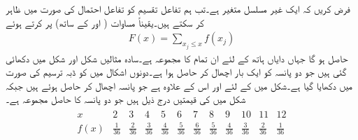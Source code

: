 فرض کریں کہ  ایک غیر مسلسل متغیر ہے۔تب ہم تفاعل تقسیم  کو تفاعل احتمال  کی صورت میں ظاہر کر سکتے ہیں۔یقیناً  مساوات  ( اور  کے ساتھ) پر کرتے ہوئے
\begin{align}\label{مساوات_شماریات_غیر_مسلسل_متغیر_ج}
F(x)=\sum_{x_j\le x} f(x_j)
\end{align}
حاصل ہو گا جہاں دایاں ہاتھ  کے لئے ان تمام  کا مجموعہ ہے۔سادہ مثالیں شکل  اور شکل  میں دکھائی گئی ہیں جو دو پانسہ کو ایک بار اچھال کر حاصل ہوا ہے۔دونوں اشکال میں  کو ڈبہ ترسیم کی صورت میں دکھایا گیا ہے۔شکل  میں  کے لئے  اور  اس کے علاوہ  ہے جو پانسہ اچھال کر حاصل ہوئے ہیں  جبکہ شکل  میں  کی قیمتیں درج ذیل ہیں جو دو پانسہ کا حاصل مجموعہ ہے۔ 
\begin{align*}
\begin{array}{c|ccccccccccc}
x&2&3&4&5&6&7&8&9&10&11&12\\
\hline
f(x)&\frac{1}{36}&\frac{2}{36}&\frac{3}{36}&\frac{4}{36}&\frac{5}{36}&\frac{6}{36}&\frac{5}{36}&\frac{4}{36}&\frac{3}{36}&\frac{2}{36}&\frac{1}{36}
\end{array}
\end{align*}
%
